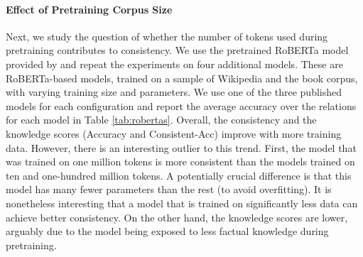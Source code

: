 









\paragraph{Effect of Pretraining Corpus Size}
Next, we study the question of whether the number of tokens used during pretraining contributes to consistency.
We use the pretrained RoBERTa model provided by \citet{robertas} and repeat the experiments on four additional models.
These are RoBERTa-based models, trained on a sample of Wikipedia and the book corpus, with varying training size and parameters. We use one of the three published models for each configuration and report the average accuracy over the relations for each model in Table \ref{tab:robertas}.
Overall, the consistency and the knowledge scores (Accuracy and
Consistent-Acc) improve
with more training data.
However, there is an interesting outlier to this trend.
First, the model that was trained on one million tokens is
more consistent than the models trained on ten and
one-hundred million tokens. A potentially crucial difference
is that this model
has many fewer parameters than the rest (to avoid overfitting). It is nonetheless interesting that a model that is trained on significantly less data can achieve better consistency. On the other hand, the knowledge scores are lower, arguably due to the model being exposed to less factual knowledge during pretraining.





